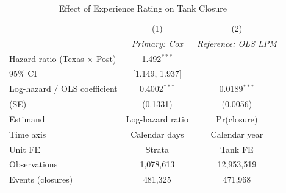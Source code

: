 \begin{table}[htbp]
\centering
\caption{Effect of Experience Rating on Tank Closure}
\label{tbl:duration_models}
\begin{tabular}{lcc}
\toprule
 & (1) & (2) \\
 & \textit{Primary: Cox} & \textit{Reference: OLS LPM} \\
\midrule
Hazard ratio (Texas $\times$ Post) & 1.492$^{***}$ & --- \\
95\% CI & [1.149, 1.937] & \\
\addlinespace
Log-hazard / OLS coefficient & 0.4002$^{***}$ & 0.0189$^{***}$ \\
(SE) & (0.1331) & (0.0056) \\
\midrule
Estimand         & Log-hazard ratio & Pr(closure) \\
Time axis        & Calendar days    & Calendar year \\
Unit FE          & Strata           & Tank FE \\
\midrule
Observations      & 1,078,613 & 12,953,519 \\
Events (closures) & 481,325 & 471,968 \\
\bottomrule
\end{tabular}
\end{table}
